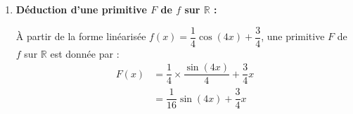 \documentclass[12pt,a4paper]{article}
\begin{document}
\begin{enumerate}
\begin{enumerate}
        Calculons séparément $\sin^4 x$ et $\cos^4 x$ :
        $$
        \begin{aligned}
            \sin^4 x &= \left(\dfrac{e^{ix} - e^{-ix}}{2i}\right)^4 \\
            &= \dfrac{1}{16}\left(e^{i4x} - 4e^{i2x} + 6 - 4e^{-i2x} + e^{-i4x}\right) \\
            &= \dfrac{1}{16}\left[\left(e^{i4x} + e^{-i4x}\right) - 4\left(e^{i2x} + e^{-i2x}\right) + 6\right] \\
            &= \dfrac{1}{16}\left(2\cos 4x - 8\cos 2x + 6\right) \\
            &= \dfrac{1}{8}\cos 4x - \dfrac{1}{2}\cos 2x + \dfrac{3}{8}
        \end{aligned}
        $$
        et
        $$
        \begin{aligned}
            \cos^4 x &= \left(\dfrac{e^{ix} + e^{-ix}}{2}\right)^4 \\
            &= \dfrac{1}{16}\left(e^{i4x} + 4e^{i2x} + 6 + 4e^{-i2x} + e^{-i4x}\right) \\
            &= \dfrac{1}{16}\left[\left(e^{i4x} + e^{-i4x}\right) + 4\left(e^{i2x} + e^{-i2x}\right) + 6\right] \\
            &= \dfrac{1}{16}\left(2\cos 4x + 8\cos 2x + 6\right) \\
            &= \dfrac{1}{8}\cos 4x + \dfrac{1}{2}\cos 2x + \dfrac{3}{8}
        \end{aligned}
        $$
        En additionnant les deux expressions, les termes en $\cos 2x$ s'éliminent :
        $$
        \begin{aligned}
            f(x) &= \sin^4 x + \cos^4 x \\
            &= \left(\dfrac{1}{8}\cos 4x - \dfrac{1}{2}\cos 2x + \dfrac{3}{8}\right) + \left(\dfrac{1}{8}\cos 4x + \dfrac{1}{2}\cos 2x + \dfrac{3}{8}\right) \\
            &= \dfrac{2}{8}\cos 4x + \dfrac{6}{8} \\
            &= \dfrac{1}{4}\cos 4x + \dfrac{3}{4}
        \end{aligned}
        $$

        \item \textbf{Déduction d'une primitive $F$ de $f$ sur $\mathbb{R}$ :}
        
        À partir de la forme linéarisée $f(x) = \dfrac{1}{4}\cos(4x) + \dfrac{3}{4}$, une primitive $F$ de $f$ sur $\mathbb{R}$ est donnée par :
        $$
        \begin{aligned}
            F(x) &= \dfrac{1}{4} \times \dfrac{\sin(4x)}{4} + \dfrac{3}{4}x \\
            &= \dfrac{1}{16}\sin(4x) + \dfrac{3}{4}x
        \end{aligned}
        $$
    \end{enumerate}
\end{enumerate}
\end{document}
